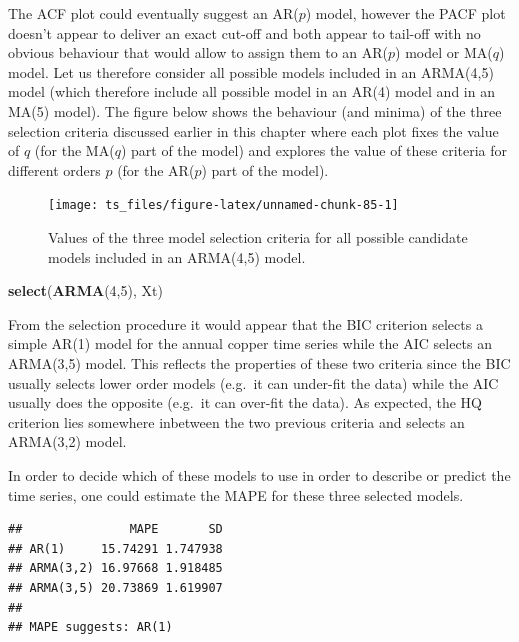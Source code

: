 \documentclass[]{book}
\newenvironment{Shaded}{\begin{snugshade}}{\end{snugshade}}
\newcommand{\KeywordTok}[1]{\textcolor[rgb]{0.13,0.29,0.53}{\textbf{#1}}}
\newcommand{\DecValTok}[1]{\textcolor[rgb]{0.00,0.00,0.81}{#1}}
\newcommand{\NormalTok}[1]{#1}
\theoremstyle{definition}
\theoremstyle{definition}
\theoremstyle{definition}
\theoremstyle{remark}
\begin{document}
The ACF plot could eventually suggest an AR(\(p\)) model, however the
PACF plot doesn't appear to deliver an exact cut-off and both appear to
tail-off with no obvious behaviour that would allow to assign them to an
AR(\(p\)) model or MA(\(q\)) model. Let us therefore consider all
possible models included in an ARMA(4,5) model (which therefore include
all possible model in an AR(4) model and in an MA(5) model). The figure
below shows the behaviour (and minima) of the three selection criteria
discussed earlier in this chapter where each plot fixes the value of
\(q\) (for the MA(\(q\)) part of the model) and explores the value of
these criteria for different orders \(p\) (for the AR(\(p\)) part of the
model).

\begin{figure}

{\centering \texttt{[image: ts\_files/figure-latex/unnamed-chunk-85-1]} 

}

\caption{Values of the three model selection criteria for all possible candidate models included in an ARMA(4,5) model.}\label{fig:unnamed-chunk-85}
\end{figure}

\begin{Shaded}
\begin{Highlighting}[]
\KeywordTok{select}\NormalTok{(}\KeywordTok{ARMA}\NormalTok{(}\DecValTok{4}\NormalTok{,}\DecValTok{5}\NormalTok{), Xt)}
\end{Highlighting}
\end{Shaded}

From the selection procedure it would appear that the BIC criterion
selects a simple AR(1) model for the annual copper time series while the
AIC selects an ARMA(3,5) model. This reflects the properties of these
two criteria since the BIC usually selects lower order models (e.g.~it
can under-fit the data) while the AIC usually does the opposite (e.g.~it
can over-fit the data). As expected, the HQ criterion lies somewhere
inbetween the two previous criteria and selects an ARMA(3,2) model.

In order to decide which of these models to use in order to describe or
predict the time series, one could estimate the MAPE for these three
selected models.

\begin{verbatim}
##               MAPE       SD
## AR(1)     15.74291 1.747938
## ARMA(3,2) 16.97668 1.918485
## ARMA(3,5) 20.73869 1.619907
## 
## MAPE suggests: AR(1)
\end{verbatim}
\end{document}
